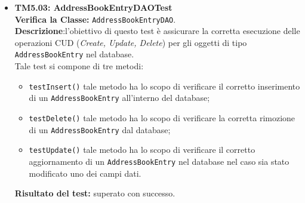 \begin{itemize}
\item \textbf{TM5.03: AddressBookEntryDAOTest}\\
\textbf{Verifica la Classe:} \texttt{AddressBookEntryDAO}.\\
\textbf{Descrizione}:l'obiettivo di questo test è assicurare la corretta esecuzione delle operazioni CUD (\textit{Create, Update, Delete}) per gli oggetti di tipo \texttt{AddressBookEntry} nel database. \\
Tale test si compone di tre metodi:
\begin{itemize}
\item \texttt{testInsert()} tale metodo ha lo scopo di verificare il corretto inserimento di un \texttt{AddressBookEntry} all'interno del database;
\item \texttt{testDelete()} tale metodo ha lo scopo di verificare la corretta rimozione di un \texttt{AddressBookEntry} dal database;
\item \texttt{testUpdate()} tale metodo ha lo scopo di verificare il corretto aggiornamento di un \texttt{AddressBookEntry} nel database nel caso sia stato modificato uno dei campi dati.

\end{itemize}
\textbf{Risultato del test:} superato con successo.



\end{itemize}
